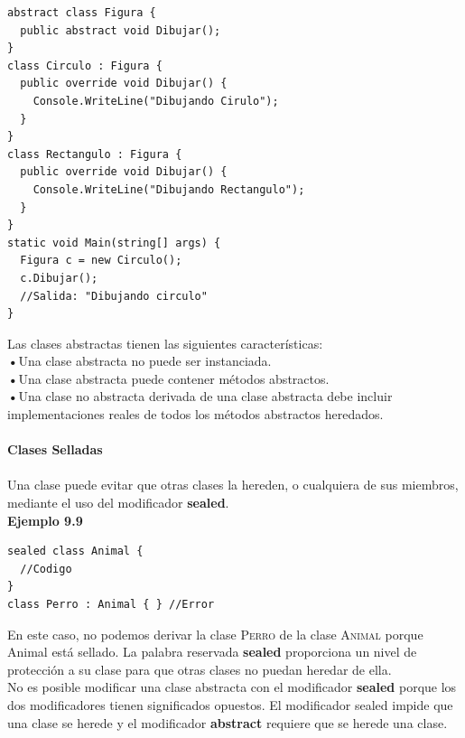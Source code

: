 \documentclass[12pt,a4paper]{report}
\begin{document}
\begin{lstlisting}
abstract class Figura {
  public abstract void Dibujar();
}
class Circulo : Figura {
  public override void Dibujar() {
    Console.WriteLine("Dibujando Cirulo");
  }
}
class Rectangulo : Figura {
  public override void Dibujar() {
    Console.WriteLine("Dibujando Rectangulo");
  }
}
static void Main(string[] args) {
  Figura c = new Circulo();
  c.Dibujar();
  //Salida: "Dibujando circulo"
}
\end{lstlisting}Las clases abstractas tienen las siguientes características:\\\textbf{•}Una clase abstracta no puede ser instanciada.\\\textbf{•}Una clase abstracta puede contener métodos abstractos.\\\textbf{•}Una clase no abstracta derivada de una clase abstracta debe incluir implementaciones reales de todos los métodos abstractos heredados.\\\\\textbf{Clases Selladas}\\\\Una clase puede evitar que otras clases la hereden, o cualquiera de sus miembros, mediante el uso del modificador \textbf{sealed}.\\\textbf{Ejemplo 9.9}
\begin{lstlisting}
sealed class Animal {
  //Codigo
}
class Perro : Animal { } //Error
\end{lstlisting}En este caso, no podemos derivar la clase\textsc{ Perro} de la clase \textsc{Animal} porque Animal está sellado. La palabra reservada\textbf{ sealed} proporciona un nivel de protección a su clase para que otras clases no puedan heredar de ella.\\No es posible modificar una clase abstracta con el modificador\textbf{ sealed} porque los dos modificadores tienen significados opuestos. El modificador sealed impide que una clase se herede y el modificador\textbf{ abstract} requiere que se herede una clase.
\end{document}
